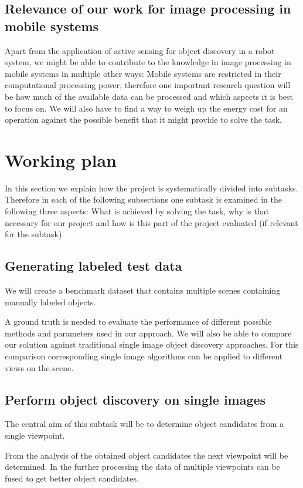 \documentclass[a4paper,11pt,english]{article}
\begin{document}
\subsection{Relevance of our work for image processing in mobile systems}

Apart from the application of active sensing for object discovery in a robot system, we might be able to contribute to the knowledge in image processing in mobile systems in multiple other ways:
Mobile systems are restricted in their computational processing power, therefore one important research question will be how much of the available data can be processed and which aspects it is best to focus on. 
We will also have to find a way to weigh up the energy cost for an operation against the possible benefit that it might provide to solve the task.

\section{Working plan}
In this section we explain how the project is systematically divided into subtasks.
Therefore in each of the following subsections one subtask is examined in the following three aspects: What is achieved by solving the task, why is that necessary for our project and how is this part of the project evaluated (if relevant for the subtask).

\subsection{Generating labeled test data}
We will create a benchmark dataset that contains multiple scenes containing manually labeled objects.

A ground truth is needed to evaluate the performance of different possible methods and parameters used in our approach. We will also be able to compare our solution against traditional single image object discovery approaches. For this comparison corresponding single image algorithms can be applied to different views on the scene.

\subsection{Perform object discovery on single images}
The central aim of this subtask will be to determine object candidates from a single viewpoint.

From the analysis of the obtained object candidates the next viewpoint will be determined.
In the further processing the data of multiple viewpoints can be fused to get better object candidates.
\end{document}
